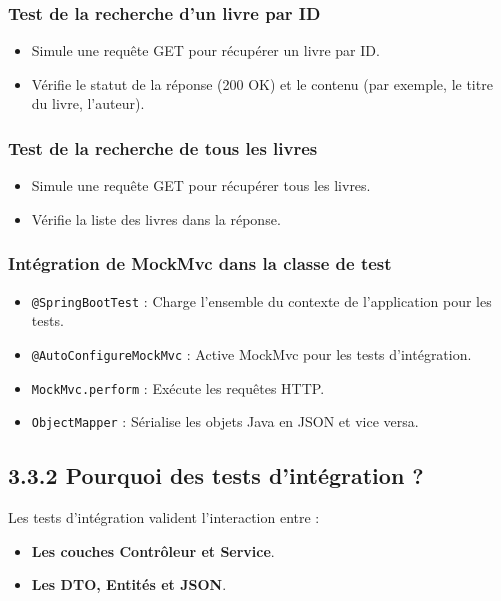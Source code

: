 \documentclass[a4paper,12pt]{article}
\begin{document}
\subsubsection{Test de la recherche d'un livre par ID}
\begin{itemize}
    \item Simule une requête GET pour récupérer un livre par ID.
    \item Vérifie le statut de la réponse (200 OK) et le contenu (par exemple, le titre du livre, l'auteur).
\end{itemize}

\subsubsection{Test de la recherche de tous les livres}
\begin{itemize}
    \item Simule une requête GET pour récupérer tous les livres.
    \item Vérifie la liste des livres dans la réponse.
\end{itemize}

\subsubsection{Intégration de MockMvc dans la classe de test}
\begin{itemize}
    \item \texttt{@SpringBootTest} : Charge l'ensemble du contexte de l'application pour les tests.
    \item \texttt{@AutoConfigureMockMvc} : Active MockMvc pour les tests d'intégration.
    \item \texttt{MockMvc.perform} : Exécute les requêtes HTTP.
    \item \texttt{ObjectMapper} : Sérialise les objets Java en JSON et vice versa.
\end{itemize}

\subsection{3.3.2 Pourquoi des tests d'intégration ?}
Les tests d'intégration valident l'interaction entre :
\begin{itemize}
    \item \textbf{Les couches Contrôleur et Service}.
    \item \textbf{Les DTO, Entités et JSON}.
\end{itemize}
\end{document}
